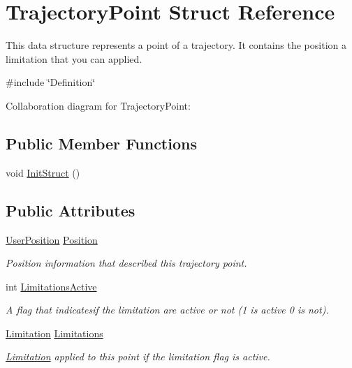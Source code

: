\hypertarget{struct_trajectory_point}{}\section{Trajectory\+Point Struct Reference}
\label{struct_trajectory_point}


This data structure represents a point of a trajectory. It contains the position a limitation that you can applied.  




{\ttfamily \#include \char`\"{}Definition\char`\"{}}



Collaboration diagram for Trajectory\+Point\+:
\subsection*{Public Member Functions}
\begin{DoxyCompactItemize}
\item 
void \hyperlink{struct_trajectory_point_a1a9f12ad88f5011c6a4644792fa67f99}{Init\+Struct} ()
\end{DoxyCompactItemize}
\subsection*{Public Attributes}
\begin{DoxyCompactItemize}
\item 
\hyperlink{struct_user_position}{User\+Position} \hyperlink{struct_trajectory_point_aa24430dc273e9d7968a6c44e3bcee259}{Position}
\begin{DoxyCompactList}\small\item\em Position information that described this trajectory point. \end{DoxyCompactList}\item 
int \hyperlink{struct_trajectory_point_acec47b76503d6f202e78bd00ec8fa02d}{Limitations\+Active}
\begin{DoxyCompactList}\small\item\em A flag that indicatesif the limitation are active or not (1 is active 0 is not). \end{DoxyCompactList}\item 
\hyperlink{struct_limitation}{Limitation} \hyperlink{struct_trajectory_point_ad6d7f13b1dee1ef3a5300ffffd77cac8}{Limitations}
\begin{DoxyCompactList}\small\item\em \hyperlink{struct_limitation}{Limitation} applied to this point if the limitation flag is active. \end{DoxyCompactList}\end{DoxyCompactItemize}


